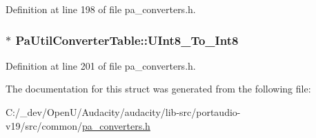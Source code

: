 Definition at line 198 of file pa\+\_\+converters.\+h.

\subsubsection[{\texorpdfstring{U\+Int8\+\_\+\+To\+\_\+\+Int8}{UInt8_To_Int8}}]{$\ast$ Pa\+Util\+Converter\+Table\+::\+U\+Int8\+\_\+\+To\+\_\+\+Int8}\hypertarget{struct_pa_util_converter_table_a26de7b4f39c4039149712252d7fec098}{}\label{struct_pa_util_converter_table_a26de7b4f39c4039149712252d7fec098}


Definition at line 201 of file pa\+\_\+converters.\+h.



The documentation for this struct was generated from the following file\+:\begin{DoxyCompactItemize}
\item 
C\+:/\+\_\+dev/\+Open\+U/\+Audacity/audacity/lib-\/src/portaudio-\/v19/src/common/\hyperlink{pa__converters_8h}{pa\+\_\+converters.\+h}\end{DoxyCompactItemize}
